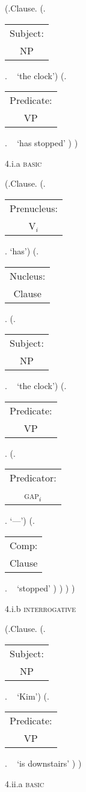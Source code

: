 \documentclass[12pt,letterpaper]{article}
\begin{document}
	\begin{figure}
	\begin{center}
		\begin{parsetree}
			(.Clause.
			(.\begin{tabular}{c}Subject:\\NP\end{tabular}.  ~ `the clock')
			(.\begin{tabular}{c}Predicate:\\VP\end{tabular}. ~  `has stopped' )
			)
			
			\hfill \break\hfill \break
		\end{parsetree}
		4.i.a \textsc{basic}
	\end{center}
\end{figure}

\begin{figure}
	\begin{center}
		\begin{parsetree}
			(.Clause.
			(.\begin{tabular}{c}Prenucleus:\\V$_i$\end{tabular}. `has')
			(.\begin{tabular}{c}Nucleus:\\Clause\end{tabular}.
			(.\begin{tabular}{c}Subject:\\NP\end{tabular}.  ~ `the clock')
			(.\begin{tabular}{c}Predicate:\\VP\end{tabular}.
			(.\begin{tabular}{c}Predicator:\\\textsc{gap}$_i$\end{tabular}. `---')
			(.\begin{tabular}{c}Comp:\\Clause\end{tabular}. ~  `stopped' )
			)
			)
			)
			
			\hfill \break\hfill \break
		\end{parsetree}
		4.i.b \textsc{interrogative}
	\end{center}
\end{figure}

	\begin{figure}
	\begin{center}
		\begin{parsetree}
			(.Clause.
			(.\begin{tabular}{c}Subject:\\NP\end{tabular}.  ~ `Kim')
			(.\begin{tabular}{c}Predicate:\\VP\end{tabular}. ~  `is downstairs' )
			)
			
			\hfill \break\hfill \break
		\end{parsetree}
		4.ii.a \textsc{basic}
	\end{center}
\end{figure}
\end{document}
